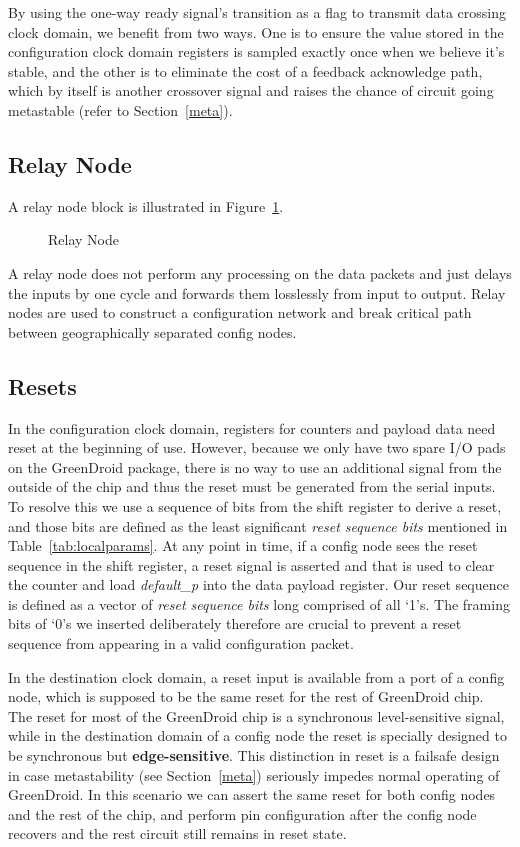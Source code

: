 \documentclass[12pt]{article}
\newcommand{\reffig}[1]{Figure~\ref{#1}}
\newcommand{\reftab}[1]{Table~\ref{#1}}
\newcommand{\refsec}[1]{Section~\ref{#1}}
\begin{document}
By using the one-way ready signal's transition as a flag to transmit data
crossing clock domain, we benefit from two ways. One is to ensure the value
stored in the configuration clock domain registers is sampled exactly once when
we believe it's stable, and the other is to eliminate the cost of a feedback
acknowledge path, which by itself is another crossover signal and raises the
chance of circuit going metastable (refer to \refsec{meta}).

\subsection{Relay Node} \label{relay-node}
A relay node block is illustrated in \reffig{fig:relay-node}.

\begin{figure}[h]
\centering

\caption{Relay Node}
\label{fig:relay-node}
\end{figure}

A relay node does not perform any processing on the data packets and just
delays the inputs by one cycle and forwards them losslessly from input to
output. Relay nodes are used to construct a configuration network and break
critical path between geographically separated config nodes.

\subsection{Resets} \label{reset}
In the configuration clock domain, registers for counters and payload data need
reset at the beginning of use. However, because we only have two spare I/O pads
on the GreenDroid package, there is no way to use an additional signal from the
outside of the chip and thus the reset must be generated from the serial
inputs. To resolve this we use a sequence of bits from the shift register to
derive a reset, and those bits are defined as the least significant
\textit{reset sequence bits} mentioned in \reftab{tab:localparams}. At any
point in time, if a config node sees the reset sequence in the shift register,
a reset signal is asserted and that is used to clear the counter and load
\textit{default\_p} into the data payload register. Our reset sequence is
defined as a vector of \textit{reset sequence bits} long comprised of all `1's.
The framing bits of `0's we inserted deliberately therefore are crucial to
prevent a reset sequence from appearing in a valid configuration packet.

In the destination clock domain, a reset input is available from a port of a
config node, which is supposed to be the same reset for the rest of GreenDroid
chip. The reset for most of the GreenDroid chip is a synchronous level-sensitive
signal, while in the destination domain of a config node the reset is specially
designed to be synchronous but \textbf{edge-sensitive}. This distinction in
reset is a failsafe design in case metastability (see \refsec{meta}) seriously
impedes normal operating of GreenDroid. In this scenario we can assert the same
reset for both config nodes and the rest of the chip, and perform pin
configuration after the config node recovers and the rest circuit still remains
in reset state.
\end{document}
